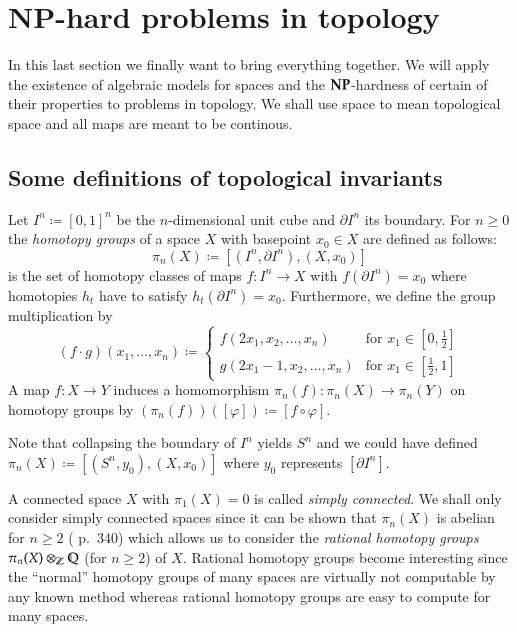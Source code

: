 \section{NP-hard problems in topology}

In this last section we finally want to bring everything together. We will apply the existence of algebraic
models for spaces and the $\mathbf{NP}$-hardness of certain of their properties to problems in topology.
We shall use space to mean topological space and all maps are meant to be continous.

\subsection{Some definitions of topological invariants}
\label{sec:DefinitionsOfTopologicalInvariants}

\begin{Definition}
 Let $I^n \coloneqq [0,1]^n$ be the $n$-dimensional unit cube and $\partial I^n$ its boundary.
 For $n \geq 0$ the \emph{homotopy groups} of a space $X$ with basepoint $x_0 \in X$ are defined as follows: 
 $$\pi_n(X) \coloneqq [(I^n, \partial I^n), (X,x_0) ]$$
 is the set of homotopy classes of maps
 $f \colon I^n \to X$ with $f(\partial I^n) = x_0$ where homotopies $h_t$ have to satisfy $h_t(\partial I^n) = x_0$.
 Furthermore, we define the group multiplication by 
 $$ (f \cdot g) (x_1, \ldots, x_n) \coloneqq 
 \begin{cases}
  f(2x_1, x_2, \ldots, x_n) &\text{for $x_1 \in [0, \frac{1}{2}]$} \\
 
  g(2x_1 - 1, x_2, \ldots, x_n) &\text{for $x_1 \in [ \frac{1}{2}, 1]$}
 \end{cases}
$$
A map $f \colon X \to Y$ induces a homomorphism $\pi_n(f) \colon \pi_n(X) \to \pi_n(Y)$
on homotopy groups by 
$(\pi_n(f)) ([\varphi]) \coloneqq [f \circ \varphi]$.
\end{Definition}

Note that collapsing the boundary of $I^n$ yields $S^n$ and we could have defined 
$\pi_n(X) \coloneqq [ (S^n, y_0), (X,x_0)]$ where $y_0$ represents $[\partial I^n]$.

\begin{Remark}
 A connected space $X$ with $\pi_1(X) = 0$ is called \emph{simply connected}. We shall only consider
 simply connected spaces since it can be shown that $\pi_n (X)$ is abelian for $n \geq 2$ 
 (\cite{SWB-334616069} p.\ 340)
 which allows us to consider the \emph{rational homotopy groups}
 $ \pi_n(X) \otimes_{\mathbb{Z}} \mathbb{Q}$ (for $n \geq 2$) of $X$. Rational homotopy groups become interesting since the ``normal''
 homotopy groups of many spaces are virtually not computable by any known method whereas rational homotopy groups
 are easy to compute for many spaces.
\end{Remark}

